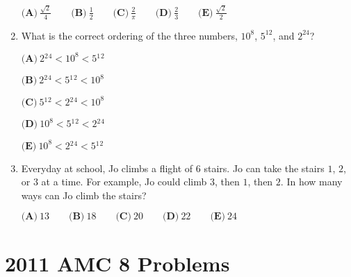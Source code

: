 \documentclass{article}
\begin{document}
\begin{enumerate}[label=\arabic*., itemsep=0.5em]
\( \textbf{(A)}\ \frac{\sqrt 2}{4}\qquad\textbf{(B)}\ \frac{1}{2}\qquad\textbf{(C)}\ \frac{2}{\pi}\qquad\textbf{(D)}\ \frac{2}{3}\qquad\textbf{(E)}\ \frac{\sqrt 2}{2} \)\par \vspace{0.5em}\item What is the correct ordering of the three numbers, \(10^8\), \(5^{12}\), and \(2^{24}\)?

\( \textbf{(A)}\ 2{}^2{}^4<10^8<5{}^1{}^2 \)

\( \textbf{(B)}\ 2{}^2{}^4<5{}^1{}^2<10^8 \)

\( \textbf{(C)}\ 5{}^1{}^2<2{}^2{}^4<10^8 \)

\( \textbf{(D)}\ 10^8<5{}^1{}^2<2{}^2{}^4\)

\( \textbf{(E)}\ 10^8<2{}^2{}^4<5{}^1{}^2 \)\par \vspace{0.5em}\item Everyday at school, Jo climbs a flight of \(6\) stairs. Jo can take the stairs \(1\), \(2\), or \(3\) at a time. For example, Jo could climb \(3\), then \(1\), then \(2\). In how many ways can Jo climb the stairs?

\( \textbf{(A)}\ 13 \qquad\textbf{(B)}\ 18\qquad\textbf{(C)}\ 20\qquad\textbf{(D)}\ 22\qquad\textbf{(E)}\ 24 \)\par \vspace{0.5em}
\end{enumerate}
\newpage\section*{2011 AMC 8 Problems}
\end{document}
